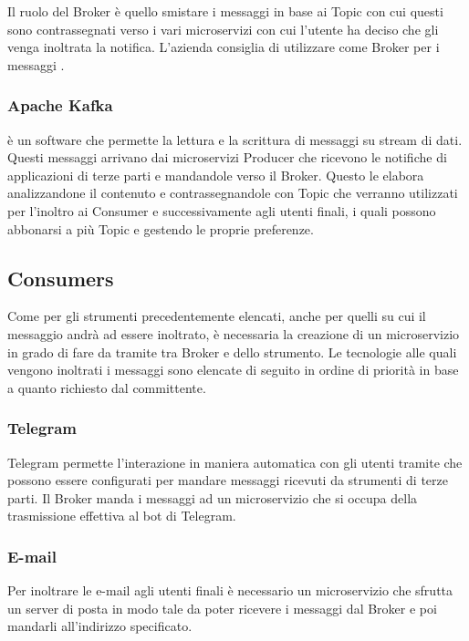 		Il ruolo del Broker è quello smistare i messaggi in base ai Topic con cui questi sono contrassegnati verso i vari microservizi con cui l'utente ha deciso che gli venga inoltrata la notifica.
		L'azienda consiglia di utilizzare come Broker per i messaggi .
	
		\subsubsection{Apache Kafka}
		 è un software  che permette la lettura e la scrittura di messaggi su stream di dati.
		Questi messaggi arrivano dai microservizi Producer che ricevono le notifiche di applicazioni di terze parti e mandandole verso il Broker. Questo le elabora analizzandone il contenuto e contrassegnandole con Topic che verranno utilizzati per l'inoltro ai Consumer e successivamente agli utenti finali, i quali possono abbonarsi a più Topic e gestendo le proprie preferenze.		
	
	\subsection{Consumers}
		Come per gli strumenti precedentemente elencati, anche per quelli su cui il messaggio andrà ad essere inoltrato, è necessaria la creazione di un microservizio in grado di fare da tramite tra Broker e  dello strumento.
		Le tecnologie alle quali vengono inoltrati i messaggi sono elencate di seguito in ordine di priorità in base a quanto richiesto dal committente.
			
		\subsubsection{Telegram}
		Telegram permette l'interazione in maniera automatica con gli utenti tramite  che possono essere configurati per mandare messaggi ricevuti da strumenti di terze parti.
		Il Broker manda i messaggi ad un microservizio che si occupa della trasmissione effettiva al bot di Telegram.
		
		\subsubsection{E-mail}
		Per inoltrare le e-mail agli utenti finali è necessario un microservizio che sfrutta un server di posta in modo tale da poter ricevere i messaggi dal Broker e poi mandarli all'indirizzo specificato.
		
